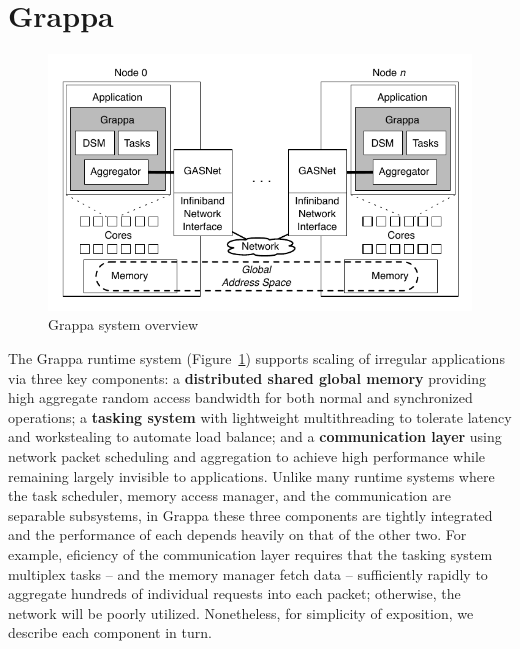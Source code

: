 \section{Grappa} \label{sec:grappa}

\begin{figure}[t]
\begin{center}
  \includegraphics[width=0.95\columnwidth]{figs/system-overview}
\begin{minipage}{0.95\columnwidth}
  \caption{\label{fig:grappa} Grappa system overview}
\end{minipage}
\vspace{-3ex}
\end{center}
\end{figure}

The Grappa runtime system (Figure~\ref{fig:grappa}) supports scaling of irregular applications via three key components:
a \textbf{distributed shared global memory} providing high aggregate random access bandwidth for both normal and synchronized operations;  
a \textbf{tasking system} with lightweight multithreading to tolerate latency and workstealing to automate load balance;
and a \textbf{communication layer} using network packet scheduling and aggregation to achieve high performance while remaining largely invisible to applications.
Unlike many runtime systems where the task scheduler, memory access manager, and the communication  are separable subsystems, in Grappa these three components are tightly integrated and the performance of each depends heavily on that of the other two.  For example, eficiency of the communication layer requires that the tasking system multiplex tasks -- and the memory manager fetch data -- sufficiently rapidly to aggregate hundreds of individual requests into each packet; otherwise, the network will be poorly utilized.  Nonetheless, for simplicity of exposition, we describe each component in turn.

